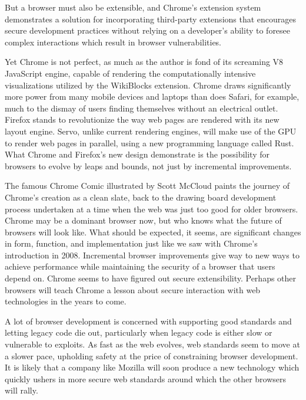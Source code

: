 \documentclass[a4paper, 11pt]{article} %
\begin{document}
But a browser must also be extensible, and Chrome's extension system demonstrates a solution for incorporating third-party extensions that encourages secure development practices without relying on a developer's ability to foresee complex interactions which result in browser vulnerabilities.

Yet Chrome is not perfect, as much as the author is fond of its screaming V8 JavaScript engine, capable of rendering the computationally intensive visualizations utilized by the WikiBlocks extension. Chrome draws significantly more power from many mobile devices and laptops than does Safari, for example, much to the dismay of users finding themselves without an electrical outlet. Firefox stands to revolutionize the way web pages are rendered with its new layout engine. Servo, unlike current rendering engines, will make use of the GPU to render web pages in parallel, using a new programming language called Rust. \cite{Servo40:online} What Chrome and Firefox's new design demonstrate is the possibility for browsers to evolve by leaps and bounds, not just by incremental improvements.

The famous Chrome Comic illustrated by Scott McCloud paints the journey of Chrome's creation as a clean slate, back to the drawing board development process undertaken at a time when the web was just too good for older browsers. \cite{chrome-comic} Chrome may be a dominant browser now, but who knows what the future of browsers will look like. What should be expected, it seems, are significant changes in form, function, and implementation just like we saw with Chrome's introduction in 2008. Incremental browser improvements give way to new ways to achieve performance while maintaining the security of a browser that users depend on. Chrome seems to have figured out secure extensibility. Perhaps other browsers will teach Chrome a lesson about secure interaction with web technologies in the years to come.

A lot of browser development is concerned with supporting good standards and letting legacy code die out, particularly when legacy code is either slow or vulnerable to exploits. As fast as the web evolves, web standards seem to move at a slower pace, upholding safety at the price of constraining browser development. It is likely that a company like Mozilla will soon produce a new technology which quickly ushers in more secure web standards around which the other browsers will rally.

\eject

\appendix
\end{document}
